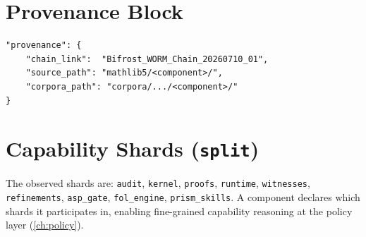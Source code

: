 \section{Provenance Block}
\label{app:meta-prov}

\begin{verbatim}
"provenance": {
    "chain_link":  "Bifrost_WORM_Chain_20260710_01",
    "source_path": "mathlib5/<component>/",
    "corpora_path": "corpora/.../<component>/"
}
\end{verbatim}

\section{Capability Shards (\texttt{split})}
\label{app:meta-split}

The observed shards are: \texttt{audit}, \texttt{kernel}, \texttt{proofs},
\texttt{runtime}, \texttt{witnesses}, \texttt{refinements},
\texttt{asp\_gate}, \texttt{fol\_engine}, \texttt{prism\_skills}. A component
declares which shards it participates in, enabling fine-grained capability
reasoning at the policy layer (\cref{ch:policy}).

